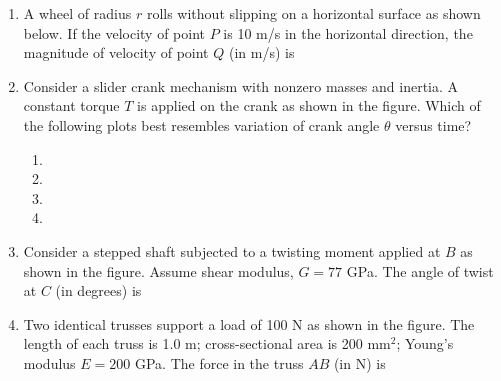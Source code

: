 \documentclass[journal,9pt,onecolumn]{IEEEtran}
\begin{document}
\begin{enumerate}
\item A wheel of radius $r$ rolls without slipping on a horizontal surface as shown below. If the velocity of point $P$ is 10 m/s in the horizontal direction, the magnitude of velocity of point $Q$ (in m/s) is
\begin{center}
    
\end{center}

\item Consider a slider crank mechanism with nonzero masses and inertia. A constant torque $T$ is applied on the crank as shown in the figure. Which of the following plots best resembles variation of crank angle $\theta$ versus time?
\begin{center}
    
\end{center}
\begin{multicols}{2}
    \begin{enumerate}
        \item 
        \item 
        \item 
        \item 
    \end{enumerate}
\end{multicols}

\item Consider a stepped shaft subjected to a twisting moment applied at $B$ as shown in the figure. Assume shear modulus, $G = 77$ GPa. The angle of twist at $C$ (in degrees) is
\begin{center}
    
\end{center}
    
\item Two identical trusses support a load of 100 N as shown in the figure. The length of each truss is 1.0 m; cross-sectional area is 200 mm$^2$; Young's modulus $E = 200$ GPa. The force in the truss $AB$ (in N) is
\begin{center}
    
\end{center}


\end{enumerate}
\end{document}
